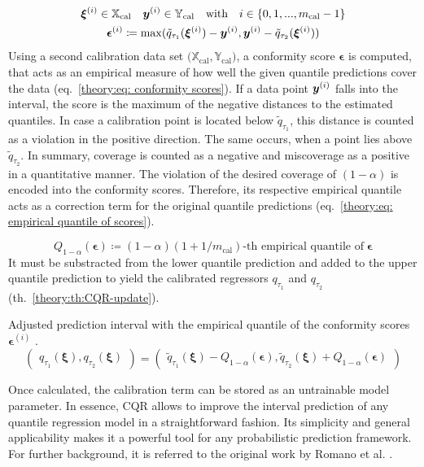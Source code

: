 \begin{equation}
    \label{theory:eq: conformity scores}
    \begin{gathered}
        \bm{\xi}^{(i)} \in \mathbb{X}_\text{cal} \quad 
        {\bm{y}}^{(i)} \in \mathbb{Y}_\text{cal} \quad
        \text{with} \quad i \in \{0, 1, ..., m_\text{cal} - 1\}
        \\ 
        \bm{\epsilon}^{(i)} \coloneq \max(\tilde{q}_{\tau_1}(\bm{\xi}^{(i)}) - {\bm{y}}^{(i)}, {\bm{y}}^{(i)} - \tilde{q}_{\tau_2}(\bm{\xi}^{(i)}))
    \end{gathered}
\end{equation}
\noindent
Using a second calibration data set $\big (\mathbb{X}_\text{cal}, \mathbb{Y}_\text{cal} \big)$, a conformity score
$\bm{\epsilon}$ is computed, that acts as an empirical measure of how well the given
quantile predictions cover the data (eq.~\ref{theory:eq: conformity scores}). If a data point ${\bm{y}}^{(i)}$
falls into the interval, the score is the maximum of the negative distances to the estimated quantiles.
In case a calibration point is located below $\tilde{q}_{\tau_1}$, this distance is counted as a violation
in the positive direction. The same occurs, when a point lies above $\tilde{q}_{\tau_2}$. In summary,
coverage is counted as a negative and miscoverage as a positive in a quantitative manner.
The violation of the desired coverage of $(1-\alpha)$ is encoded into the conformity scores. 
Therefore, its respective empirical quantile acts as a correction term for the original quantile 
predictions (eq.~\ref{theory:eq: empirical quantile of scores}).

\begin{equation}
    \label{theory:eq: empirical quantile of scores}
    Q_{1-\alpha}(\bm{\epsilon}) \coloneq (1-\alpha)(1+1/m_\text{cal})\text{-th empirical quantile of} \; \bm{\epsilon}
\end{equation}
\noindent
\noindent
It must be substracted
from the lower quantile prediction and added to the upper quantile prediction
to yield the calibrated regressors  $q_{\tau_1}$ and $q_{\tau_2}$ (th.~\ref{theory:th:CQR-update}).

\begin{theorem} Adjusted prediction interval with the empirical quantile of the conformity scores
     $\bm{\epsilon}^{(i)}$ \cite{romano2019cqr}.
    \label{theory:th:CQR-update}
    \[
        \begin{pmatrix}
            q_{\tau_1}(\bm{\xi}), q_{\tau_2}(\bm{\xi})
        \end{pmatrix} = 
        \begin{pmatrix}
            \tilde{q}_{\tau_1}(\bm{\xi}) - Q_{1-\alpha}(\bm{\epsilon}), \tilde{q}_{\tau_2}(\bm{\xi}) + Q_{1-\alpha}(\bm{\epsilon})
        \end{pmatrix}
    \]
\end{theorem}
\noindent
Once calculated, the calibration term can be stored as an untrainable model parameter.
In essence, CQR allows to improve the interval prediction of any quantile regression model in a 
straightforward fashion. Its simplicity and general applicability makes it a powerful tool 
for any probabilistic prediction framework. For further background,
it is referred to the original work by Romano et al. \cite{romano2019cqr}.


